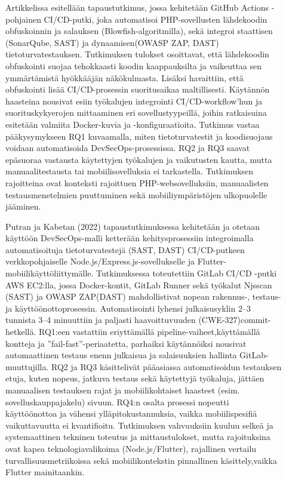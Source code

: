 \documentclass[bscthesis,finnish,oneside,biblatex]{uefcsthesis}
\begin{document}
    \begin{description}
        \item[\cite{afifah2024_coi}] Artikkelissa esitellään tapaustutkimus, jossa kehitetään GitHub Actions -pohjainen CI/CD-putki, joka automatisoi PHP-sovellusten lähdekoodin obfuskoinnin ja salauksen (Blowfish-algoritmilla), sekä integroi staattisen (SonarQube, SAST) ja dynaamisen(OWASP ZAP, DAST) tietoturvatestauksen. Tutkimuksen tulokset osoittavat, että lähdekoodin obfuskointi suojaa tehokkaasti koodin kaappauksilta ja vaikeuttaa sen ymmärtämistä hyökkääjän näkökulmasta. Lisäksi havaittiin, että obfuskointi lisää CI/CD-prosessin suoritusaikaa maltillisesti. Käytännön haasteina nousivat esiin työkalujen integrointi CI/CD-workflow’hun ja suorituskykyerojen mittaaminen eri sovellustyypeillä, joihin ratkaisuina esitetään valmiita Docker-kuvia ja -konfiguraatioita. Tutkimus vastaa pääkysymykseen RQ1 kuvaamalla, miten tietoturvatestit ja koodisuojaus voidaan automatisoida DevSecOps-prosessissa. RQ2 ja RQ3 saavat epäsuoraa vastausta käytettyjen työkalujen ja vaikutusten kautta, mutta manuaalitestausta tai mobiilisovelluksia ei tarkastella. Tutkimuksen rajoitteina ovat konteksti rajoittuen PHP-websovelluksiin, manuaalisten testausmenetelmien puuttuminen sekä mobiiliympäristöjen ulkopuolelle jääminen.
    \end{description}

    \begin{description}
        \item[\cite{putra2022_devsecops}]Putran ja Kabetan (2022) tapaustutkimuksessa kehitetään ja otetaan käyttöön DevSecOps-malli ketterään kehitysprosessiin integroimalla automatisoituja tietoturvatestejä (SAST, DAST) CI/CD-putkeen verkkopohjaiselle Node.js/Express.js-sovellukselle ja Flutter-mobiilikäyttöliittymälle. Tutkimuksessa toteutettiin GitLab CI/CD -putki AWS EC2:lla, jossa Docker-kontit, GitLab Runner sekä työkalut Njsscan (SAST) ja OWASP ZAP(DAST) mahdollistivat nopean rakennus-, testaus- ja käyttöönottoprosessin. Automatisointi lyhensi julkaisusyklin 2–3 tunnista 3–4 minuuttiin ja paljasti haavoittuvuuden (CWE-327)commit-hetkellä. RQ1:een vastattiin eriyttämällä pipeline-vaiheet,käyttämällä kontteja ja ”fail-fast”-periaatetta, parhaiksi käytännöiksi nousivat automaattinen testaus enenn julkaisua ja salaisuuksien hallinta GitLab-muuttujilla. RQ2 ja RQ3 käsittelivät pääasiassa automatisoidun testauksen etuja, kuten nopeus, jatkuva testaus sekä käytettyjä työkaluja, jättäen manuaalisen testauksen rajat ja mobiilikohtaiset haasteet (esim. sovelluskauppajakelu) sivuun. RQ4:n osalta prosessi nopeutti käyttöönottoa ja vähensi ylläpitokustannuksia, vaikka mobiilispesifiä vaikuttavuutta ei kvantifioitu. Tutkimuksen vahvuuksiin kuuluu selkeä ja systemaattinen tekninen toteutus ja mittaustulokset, mutta rajoituksina ovat kapea teknologiavalikoima (Node.js/Flutter), rajallinen vertailu turvallisuusmetriikoissa sekä mobiilikontekstin pinnallinen käsittely,vaikka Flutter mainitaankin.
    \end{description}
\end{document}
